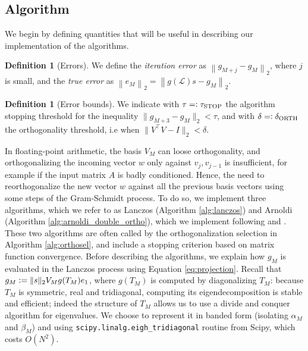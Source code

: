 \documentclass[11pt]{article}
\renewcommand{\L}{\mathcal{L}}
\newcommand{\defeq}{\vcentcolon=}
\newcommand{\eqdef}{=\vcentcolon}
\newcommand{\norm}[1]{\left\lVert#1\right\rVert}
\theoremstyle{definition}
\newtheorem{definition}[theorem]{Definition}
\theoremstyle{remark}
\theoremstyle{experimental}
\begin{document}
\subsection{Algorithm}
\label{ssec:algo}

We begin by defining quantities that will be useful in describing our implementation of the algorithms.

\begin{definition}[Errors]
  \label{def:errors}
  We define the \emph{iteration error} as $\norm{g_{M+j} - g_M}_2 $, where $ j $ is small,
  and the \emph{true error} as $ \norm{e_M}_2 = \norm{g(\L)s - g_M}_2 $.
\end{definition}
\begin{definition}[Error bounds]
  We indicate with $ \tau \eqdef \tau_{\text{STOP}} $ the algorithm stopping threshold for the
  inequality
  $ \| g_{M+3} -g_M \|_2< \tau $, and with $ \delta \eqdef \delta_{\text{ORTH}} $ the orthogonality
  threshold, i.e when $ \| V^{\top} V - I \|_2 < \delta $.
\end{definition}



In floating-point arithmetic, the basis $ V_M $ can loose orthogonality, and orthogonalizing
the incoming vector $ w $ only against $ v_j,v_{j-1} $ is insufficient, for example if the input
matrix $ A $ is badly conditioned. Hence, the need to
reorthogonalize the new vector $ w $ against all the previous basis vectors using some steps of the
Gram-Schmidt process. To do so, we implement three algorithms, which we refer to as Lanczos 
(Algorithm \ref{alg:lanczos}) and Arnoldi (Algorithm \ref{alg:arnoldi_double_ortho}), which we
implement following \cite{demmel1997} and \cite{susnjara2015}. These two algorithms are often called
by the orthogonalization selection in Algorithm \ref{alg:orthosel}, and include a stopping criterion
based on matrix function convergence. Before describing the algorithms, we explain how $ g_M $ is
evaluated in the Lanczos process using Equation \ref{eq:projection}.
Recall that $  g_M \defeq \|s\|_2V_Mg(T_M)e_1
$, where $ g(T_M) $ is computed by diagonalizing $ T_M $: because $ T_M $ is symmetric, real and tridiagonal, 
computing its eigendecomposition is stable and efficient; indeed the structure of $ T_M $ allows us
to use a divide and conquer algorithm for eigenvalues. We choose to represent it in banded form
(isolating $ \alpha_M $ and $ \beta_M $) and using \texttt{scipy.linalg.eigh\_tridiagonal} routine
from Scipy, which costs $ O(N^2) $.
\end{document}
